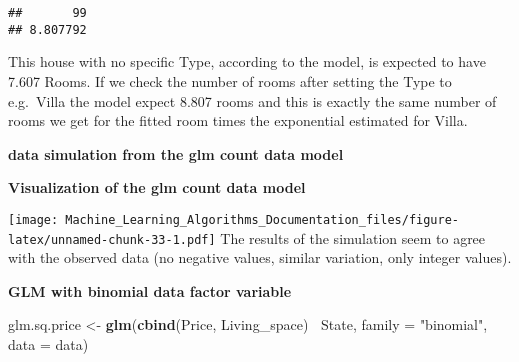 \documentclass[
]{article}
\newenvironment{Shaded}{\begin{snugshade}}{\end{snugshade}}
\newcommand{\CharTok}[1]{\textcolor[rgb]{0.31,0.60,0.02}{#1}}
\newcommand{\DataTypeTok}[1]{\textcolor[rgb]{0.13,0.29,0.53}{#1}}
\newcommand{\DecValTok}[1]{\textcolor[rgb]{0.00,0.00,0.81}{#1}}
\newcommand{\KeywordTok}[1]{\textcolor[rgb]{0.13,0.29,0.53}{\textbf{#1}}}
\newcommand{\NormalTok}[1]{#1}
\newcommand{\OperatorTok}[1]{\textcolor[rgb]{0.81,0.36,0.00}{\textbf{#1}}}
\newcommand{\StringTok}[1]{\textcolor[rgb]{0.31,0.60,0.02}{#1}}
\begin{document}
\begin{verbatim}
##       99 
## 8.807792
\end{verbatim}

This house with no specific Type, according to the model, is expected to
have 7.607 Rooms. If we check the number of rooms after setting the Type
to e.g.~Villa the model expect 8.807 rooms and this is exactly the same
number of rooms we get for the fitted room times the exponential
estimated for Villa.

\textbf{data simulation from the glm count data model}

\textbf{Visualization of the glm count data model}

\begin{Shaded}
\end{Shaded}

\texttt{[image: Machine\_Learning\_Algorithms\_Documentation\_files/figure-latex/unnamed-chunk-33-1.pdf]}
The results of the simulation seem to agree with the observed data (no
negative values, similar variation, only integer values).

\textbf{GLM with binomial data factor variable}

\begin{Shaded}
\begin{Highlighting}[]
\NormalTok{glm.sq.price <-}\StringTok{ }\KeywordTok{glm}\NormalTok{(}\KeywordTok{cbind}\NormalTok{(Price, Living_space)}\OperatorTok{~}\StringTok{ }\NormalTok{State,}
                    \DataTypeTok{family =} \StringTok{"binomial"}\NormalTok{,}
                    \DataTypeTok{data =}\NormalTok{ data)}
\end{Highlighting}
\end{Shaded}
\end{document}

